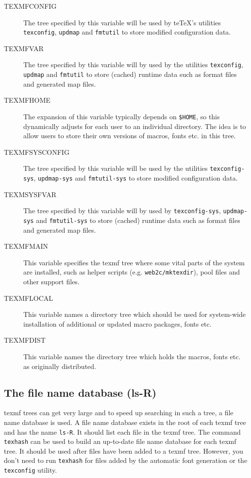 \documentclass[11pt,a4paper]{article}
\begin{document}
\begin{description}
\item [TEXMFCONFIG] The tree specified by this variable will be used
  by te\TeX's utilities \verb+texconfig+, \verb+updmap+ and \verb+fmtutil+
  to store modified configuration data.
\item [TEXMFVAR] The tree specified by this variable will by used by
  the utilities \verb+texconfig+, \verb+updmap+ and \verb+fmtutil+ to
  store (cached) runtime data such as format files and generated map
  files.
\item [TEXMFHOME] The expansion of this variable typically depends on \verb+$HOME+, %
  so this dynamically adjusts for each user to an individual
  directory. The idea is to allow users to store their own versions of
  macros, fonts etc. in this tree.
\item [TEXMFSYSCONFIG] The tree specified by this variable will be
  used by the utilities \verb+texconfig-sys+, \verb+updmap-sys+
  and \verb+fmtutil-sys+ to store modified configuration data.
\item [TEXMSYSFVAR] The tree specified by this variable will by used
  by \verb+texconfig-sys+, \verb+updmap-sys+ and \verb+fmtutil-sys+ to
  store (cached) runtime data such as format files and generated map
  files.
\item [TEXMFMAIN] This variable specifies the texmf tree where some
  vital parts of the system are installed, such as helper scripts
  (e.g. \verb+web2c/mktexdir+), pool files and other support files.
\item [TEXMFLOCAL] This variable names a directory tree which should
  be used for system-wide installation of additional or updated macro
  packages, fonts etc.
\item [TEXMFDIST] This variable names the directory tree which holds
  the macros, fonts etc. as originally distributed.
\end{description}

\subsection{The file name database (ls-R)}
texmf trees can get very large and to speed up searching in such a
tree, a file name database is used. A file name database exists in the
root of each texmf tree and has the name \verb+ls-R+. It should list
each file in the texmf tree. The command \verb+texhash+ can be used to
build an up-to-date file name database for each texmf tree. It should
be used after files have been added to a texmf tree. However, you
don't need to run \verb+texhash+ for files added by the automatic font
generation or the \texttt{texconfig} utility.
\end{document}
